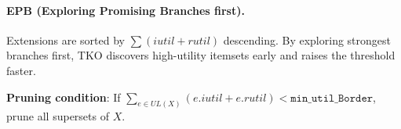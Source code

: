\paragraph{EPB (Exploring Promising Branches first).}
Extensions are sorted by $\sum(iutil + rutil)$ descending. By exploring strongest branches first, TKO discovers high-utility itemsets early and raises the threshold faster.

\textbf{Pruning condition}: If $\sum_{e \in UL(X)} (e.iutil + e.rutil) < \texttt{min\_util\_Border}$, prune all supersets of $X$.
